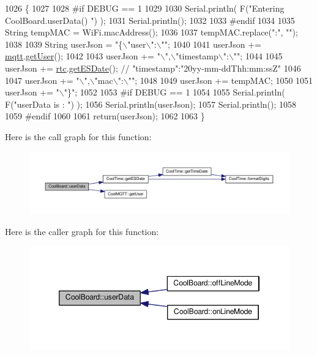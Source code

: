 \begin{DoxyCode}
1026 \{
1027 
1028 \textcolor{preprocessor}{#if DEBUG == 1}
1029 
1030     Serial.println( F(\textcolor{stringliteral}{"Entering CoolBoard.userData() "}) );
1031     Serial.println();
1032 
1033 \textcolor{preprocessor}{#endif}
1034 
1035     String tempMAC = WiFi.macAddress();
1036 
1037     tempMAC.replace(\textcolor{stringliteral}{":"}, \textcolor{stringliteral}{""});
1038 
1039     String userJson = \textcolor{stringliteral}{"\{\(\backslash\)"user\(\backslash\)":\(\backslash\)""};
1040 
1041     userJson += \hyperlink{classCoolBoard_a2399f44d7c23c1149a335cb3b46d90f1}{mqtt}.\hyperlink{classCoolMQTT_a373cc92fca7760d886f02d8a6e5b3f63}{getUser}();
1042 
1043     userJson += \textcolor{stringliteral}{"\(\backslash\)",\(\backslash\)"timestamp\(\backslash\)":\(\backslash\)""};
1044 
1045     userJson += \hyperlink{classCoolBoard_a50d2a6716879d64a85f3c6b44ad63275}{rtc}.\hyperlink{classCoolTime_ac4f32ee513c1328d984306645e8785a4}{getESDate}(); \textcolor{comment}{// "timestamp":"20yy-mm-ddThh:mm:ssZ"}
1046 
1047     userJson += \textcolor{stringliteral}{"\(\backslash\)",\(\backslash\)"mac\(\backslash\)":\(\backslash\)""};
1048 
1049     userJson += tempMAC;
1050 
1051     userJson += \textcolor{stringliteral}{"\(\backslash\)"\}"};
1052 
1053 \textcolor{preprocessor}{#if DEBUG == 1}
1054 
1055     Serial.println( F(\textcolor{stringliteral}{"userData is : "}) );
1056     Serial.println(userJson);
1057     Serial.println();
1058 
1059 \textcolor{preprocessor}{#endif  }
1060     
1061     \textcolor{keywordflow}{return}(userJson);
1062     
1063 \}
\end{DoxyCode}
Here is the call graph for this function\+:
\nopagebreak
\begin{figure}[H]
\begin{center}
\leavevmode
\includegraphics[width=350pt]{classCoolBoard_ae7358fb6e623cfc81b775f5f1734909b_cgraph}
\end{center}
\end{figure}
Here is the caller graph for this function\+:
\nopagebreak
\begin{figure}[H]
\begin{center}
\leavevmode
\includegraphics[width=346pt]{classCoolBoard_ae7358fb6e623cfc81b775f5f1734909b_icgraph}
\end{center}
\end{figure}


